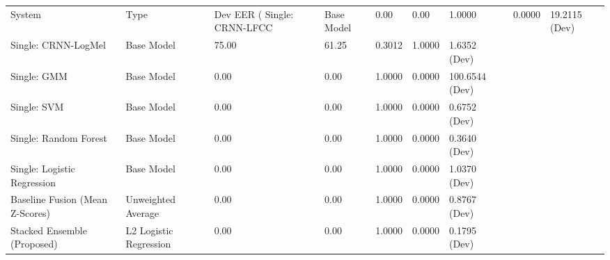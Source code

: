 \begin{tabular}{lllllll}
\toprule
System & Type & Dev EER (%
\midrule
Single: CRNN-LFCC & Base Model & 0.00 & 0.00 & 1.0000 & 0.0000 & 19.2115 (Dev) \\
Single: CRNN-LogMel & Base Model & 75.00 & 61.25 & 0.3012 & 1.0000 & 1.6352 (Dev) \\
Single: GMM & Base Model & 0.00 & 0.00 & 1.0000 & 0.0000 & 100.6544 (Dev) \\
Single: SVM & Base Model & 0.00 & 0.00 & 1.0000 & 0.0000 & 0.6752 (Dev) \\
Single: Random Forest & Base Model & 0.00 & 0.00 & 1.0000 & 0.0000 & 0.3640 (Dev) \\
Single: Logistic Regression & Base Model & 0.00 & 0.00 & 1.0000 & 0.0000 & 1.0370 (Dev) \\
Baseline Fusion (Mean Z-Scores) & Unweighted Average & 0.00 & 0.00 & 1.0000 & 0.0000 & 0.8767 (Dev) \\
Stacked Ensemble (Proposed) & L2 Logistic Regression & 0.00 & 0.00 & 1.0000 & 0.0000 & 0.1795 (Dev) \\
\bottomrule
\end{tabular}
